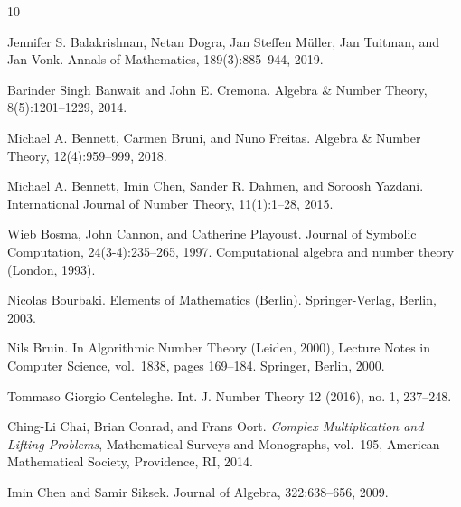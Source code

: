 \documentclass[12pt]{amsart}
\numberwithin{equation}{section}
\theoremstyle{definition}
\begin{document}
\begin{thebibliography}{10}

Jennifer S. Balakrishnan, Netan Dogra, Jan Steffen Müller, Jan Tuitman, and Jan Vonk.
\newblock Annals of Mathematics, 189(3):885--944, 2019.

Barinder Singh Banwait and John E. Cremona.
\newblock Algebra \& Number Theory, 8(5):1201--1229, 2014.

Michael A. Bennett, Carmen Bruni, and Nuno Freitas.
\newblock Algebra \& Number Theory, 12(4):959--999, 2018.

Michael A. Bennett, Imin Chen, Sander R. Dahmen, and Soroosh Yazdani.
\newblock International Journal of Number Theory, 11(1):1--28, 2015.

Wieb Bosma, John Cannon, and Catherine Playoust.
\newblock Journal of Symbolic Computation, 24(3-4):235--265, 1997.
\newblock Computational algebra and number theory (London, 1993).

Nicolas Bourbaki.
\newblock Elements of Mathematics (Berlin). Springer-Verlag, Berlin, 2003.

Nils Bruin.
\newblock In Algorithmic Number Theory (Leiden, 2000), Lecture Notes in Computer Science, vol.~1838, pages 169--184. Springer, Berlin, 2000.

Tommaso Giorgio Centeleghe.
\newblock Int. J. Number Theory 12 (2016), no. 1, 237–248.


Ching-Li Chai, Brian Conrad, and Frans Oort.
\emph{Complex Multiplication and Lifting Problems},
Mathematical Surveys and Monographs, vol.~195,
American Mathematical Society, Providence, RI, 2014.

Imin Chen and Samir Siksek.
\newblock Journal of Algebra, 322:638--656, 2009.


\end{thebibliography}
\end{document}
